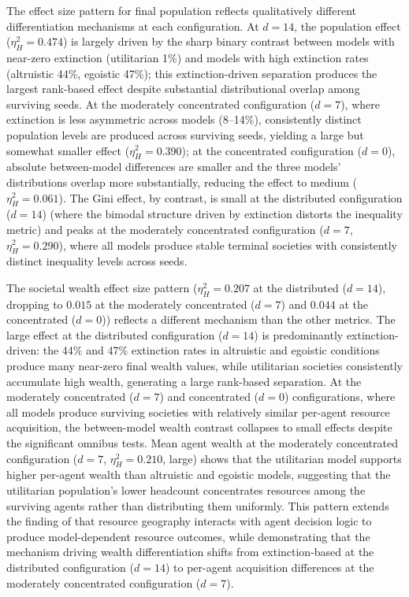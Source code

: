 \documentclass{icsthesis}
\begin{document}
\begin{mainmatter}
The effect size pattern for final population reflects qualitatively different differentiation mechanisms at each configuration. At $d = 14$, the population effect ($\eta^2_H = 0.474$) is largely driven by the sharp binary contrast between models with near-zero extinction (utilitarian 1\%) and models with high extinction rates (altruistic 44\%, egoistic 47\%); this extinction-driven separation produces the largest rank-based effect despite substantial distributional overlap among surviving seeds. At the moderately concentrated configuration ($d = 7$), where extinction is less asymmetric across models (8--14\%), consistently distinct population levels are produced across surviving seeds, yielding a large but somewhat smaller effect ($\eta^2_H = 0.390$); at the concentrated configuration ($d = 0$), absolute between-model differences are smaller and the three models' distributions overlap more substantially, reducing the effect to medium ($\eta^2_H = 0.061$). The Gini effect, by contrast, is small at the distributed configuration ($d = 14$) (where the bimodal structure driven by extinction distorts the inequality metric) and peaks at the moderately concentrated configuration ($d = 7$, $\eta^2_H = 0.290$), where all models produce stable terminal societies with consistently distinct inequality levels across seeds.

The societal wealth effect size pattern ($\eta^2_H = 0.207$ at the distributed ($d = 14$), dropping to $0.015$ at the moderately concentrated ($d = 7$) and $0.044$ at the concentrated ($d = 0$)) reflects a different mechanism than the other metrics. The large effect at the distributed configuration ($d = 14$) is predominantly extinction-driven: the 44\% and 47\% extinction rates in altruistic and egoistic conditions produce many near-zero final wealth values, while utilitarian societies consistently accumulate high wealth, generating a large rank-based separation. At the moderately concentrated ($d = 7$) and concentrated ($d = 0$) configurations, where all models produce surviving societies with relatively similar per-agent resource acquisition, the between-model wealth contrast collapses to small effects despite the significant omnibus tests. Mean agent wealth at the moderately concentrated configuration ($d = 7$, $\eta^2_H = 0.210$, large) shows that the utilitarian model supports higher per-agent wealth than altruistic and egoistic models, suggesting that the utilitarian population's lower headcount concentrates resources among the surviving agents rather than distributing them uniformly. This pattern extends the finding of \citet{Hawick2014} that resource geography interacts with agent decision logic to produce model-dependent resource outcomes, while demonstrating that the mechanism driving wealth differentiation shifts from extinction-based at the distributed configuration ($d = 14$) to per-agent acquisition differences at the moderately concentrated configuration ($d = 7$).


\end{mainmatter}
\end{document}
